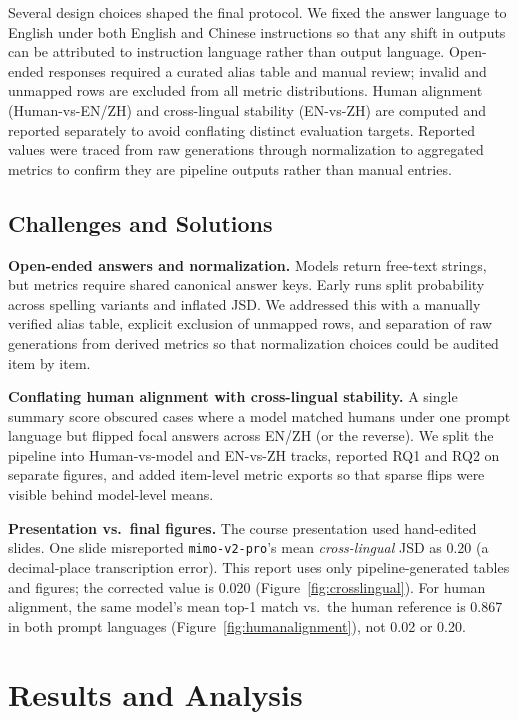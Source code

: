 \documentclass[11pt]{article}
\begin{document}
Several design choices shaped the final protocol. We fixed the answer language to English under both English and Chinese instructions so that any shift in outputs can be attributed to instruction language rather than output language. Open-ended responses required a curated alias table and manual review; invalid and unmapped rows are excluded from all metric distributions. Human alignment (Human-vs-EN/ZH) and cross-lingual stability (EN-vs-ZH) are computed and reported separately to avoid conflating distinct evaluation targets. Reported values were traced from raw generations through normalization to aggregated metrics to confirm they are pipeline outputs rather than manual entries.

\subsection{Challenges and Solutions}
\label{sec:challenges}

\textbf{Open-ended answers and normalization.}
Models return free-text strings, but metrics require shared canonical answer keys. Early runs split probability across spelling variants and inflated JSD. We addressed this with a manually verified alias table, explicit exclusion of unmapped rows, and separation of raw generations from derived metrics so that normalization choices could be audited item by item.

\textbf{Conflating human alignment with cross-lingual stability.}
A single summary score obscured cases where a model matched humans under one prompt language but flipped focal answers across EN/ZH (or the reverse). We split the pipeline into Human-vs-model and EN-vs-ZH tracks, reported RQ1 and RQ2 on separate figures, and added item-level metric exports so that sparse flips were visible behind model-level means.

\textbf{Presentation vs.\ final figures.}
The course presentation used hand-edited slides. One slide misreported \texttt{mimo-v2-pro}'s mean \emph{cross-lingual} JSD as 0.20 (a decimal-place transcription error). This report uses only pipeline-generated tables and figures; the corrected value is 0.020 (Figure~\ref{fig:crosslingual}). For human alignment, the same model's mean top-1 match vs.\ the human reference is 0.867 in both prompt languages (Figure~\ref{fig:humanalignment}), not 0.02 or 0.20.

\section{Results and Analysis}
\label{sec:results}
\end{document}
